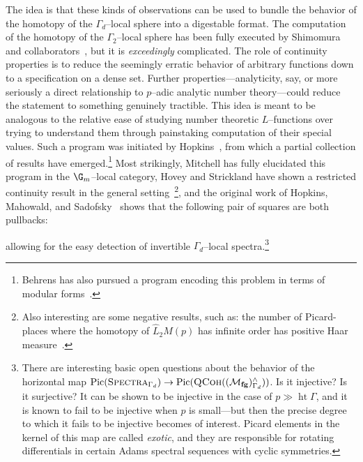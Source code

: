 The idea is that these kinds of observations can be used to bundle the behavior of the homotopy of the \(\Gamma_d\)--local sphere into a digestable format.  The computation of the homotopy of the \(\Gamma_2\)--local sphere has been fully executed by Shimomura and collaborators~\cite{Shimomura,ShimomuraYabeM20,ShimomuraYabeL2S,BehrensRevisited}, but it is \emph{exceedingly} complicated.  The role of continuity properties is to reduce the seemingly erratic behavior of arbitrary functions down to a specification on a dense set.  Further properties---analyticity, say, or more seriously a direct relationship to \(p\)--adic analytic number theory---could reduce the statement to something genuinely tractible.  This idea is meant to be analogous to the relative ease of studying number theoretic \(L\)--functions over trying to understand them through painstaking computation of their special values.  Such a program was initiated by Hopkins~\cite{StricklandpAdicInterpolation}, from which a partial collection of results have emerged.\footnote{Behrens has also pursued a program encoding this problem in terms of modular forms~\cite{BehrensCongruences,BehrensModularDescription,BehrensBuildings}.}  Most strikingly, Mitchell \cite{MitchellIwasawa,HahnMitchell} has fully elucidated this program in the \(\G_m\)--local category, Hovey and Strickland have shown a restricted continuity result in the general setting~\cite[Section 14]{HoveyStrickland}\footnote{Also interesting are some negative results, such as: the number of Picard-places where the homotopy of \(\widehat L_2 M(p)\) has infinite order has positive Haar measure~\cite[Section 15.2]{HoveyStrickland}.}, and the original work of Hopkins, Mahowald, and Sadofsky~\cite{HMS} shows that the following pair of squares are both pullbacks:
\begin{center}
\end{center}
allowing for the easy detection of invertible \(\Gamma_d\)--local spectra.\footnote{There are interesting basic open questions about the behavior of the horizontal map \(\operatorname{Pic}(\normalfont\textsc{Spectra}_{\Gamma_d}) \to \operatorname{Pic}(\normalfont\textsc{QCoh}((\mathcal{M}_{\mathbf{fg}})^\wedge_{\Gamma_d}))\).  Is it injective?  Is it surjective?  It can be shown to be injective in the case of \(p \gg \operatorname{ht} \Gamma\), and it is known to fail to be injective when \(p\) is small---but then the precise degree to which it fails to be injective becomes of interest.  Picard elements in the kernel of this map are called \textit{exotic}, and they are responsible for rotating differentials in certain Adams spectral sequences with cyclic symmetries.}

